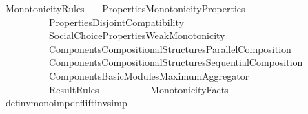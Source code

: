 %
\begin{isabellebody}%
%
%
\isadelimtheory
%
\endisadelimtheory
%
\isatagtheory
{}\isamarkupfalse%
\ Monotonicity{\isacharunderscore}{\kern0pt}Rules\isanewline
\ \ \ {\isachardoublequoteopen}{\isachardot}{\kern0pt}{\isachardot}{\kern0pt}{\isacharslash}{\kern0pt}Properties{\isacharslash}{\kern0pt}Monotonicity{\isacharunderscore}{\kern0pt}Properties{\isachardoublequoteclose}\isanewline
\ \ \ \ \ \ \ \ \ \ {\isachardoublequoteopen}{\isachardot}{\kern0pt}{\isachardot}{\kern0pt}{\isacharslash}{\kern0pt}Properties{\isacharslash}{\kern0pt}Disjoint{\isacharunderscore}{\kern0pt}Compatibility{\isachardoublequoteclose}\isanewline
\ \ \ \ \ \ \ \ \ \ {\isachardoublequoteopen}{\isachardot}{\kern0pt}{\isachardot}{\kern0pt}{\isacharslash}{\kern0pt}{\isachardot}{\kern0pt}{\isachardot}{\kern0pt}{\isacharslash}{\kern0pt}Social{\isacharunderscore}{\kern0pt}Choice{\isacharunderscore}{\kern0pt}Properties{\isacharslash}{\kern0pt}Weak{\isacharunderscore}{\kern0pt}Monotonicity{\isachardoublequoteclose}\isanewline
\ \ \ \ \ \ \ \ \ \ {\isachardoublequoteopen}{\isachardot}{\kern0pt}{\isachardot}{\kern0pt}{\isacharslash}{\kern0pt}Components{\isacharslash}{\kern0pt}Compositional{\isacharunderscore}{\kern0pt}Structures{\isacharslash}{\kern0pt}Parallel{\isacharunderscore}{\kern0pt}Composition{\isachardoublequoteclose}\isanewline
\ \ \ \ \ \ \ \ \ \ {\isachardoublequoteopen}{\isachardot}{\kern0pt}{\isachardot}{\kern0pt}{\isacharslash}{\kern0pt}Components{\isacharslash}{\kern0pt}Compositional{\isacharunderscore}{\kern0pt}Structures{\isacharslash}{\kern0pt}Sequential{\isacharunderscore}{\kern0pt}Composition{\isachardoublequoteclose}\isanewline
\ \ \ \ \ \ \ \ \ \ {\isachardoublequoteopen}{\isachardot}{\kern0pt}{\isachardot}{\kern0pt}{\isacharslash}{\kern0pt}Components{\isacharslash}{\kern0pt}Basic{\isacharunderscore}{\kern0pt}Modules{\isacharslash}{\kern0pt}Maximum{\isacharunderscore}{\kern0pt}Aggregator{\isachardoublequoteclose}\isanewline
\ \ \ \ \ \ \ \ \ \ Result{\isacharunderscore}{\kern0pt}Rules\isanewline
\ \ \ \ \ \ \ \ \ \ Monotonicity{\isacharunderscore}{\kern0pt}Facts\isanewline
\isanewline
{}%
\endisatagtheory
{\isafoldtheory}%
%
\isadelimtheory
\isanewline
%
\endisadelimtheory
\isanewline
\isanewline
{}\isamarkupfalse%
\ def{\isacharunderscore}{\kern0pt}inv{\isacharunderscore}{\kern0pt}mono{\isacharunderscore}{\kern0pt}imp{\isacharunderscore}{\kern0pt}def{\isacharunderscore}{\kern0pt}lift{\isacharunderscore}{\kern0pt}inv{\isacharbrackleft}{\kern0pt}simp{\isacharbrackright}{\kern0pt}{\isacharcolon}{\kern0pt}\isanewline

\end{isabellebody}
